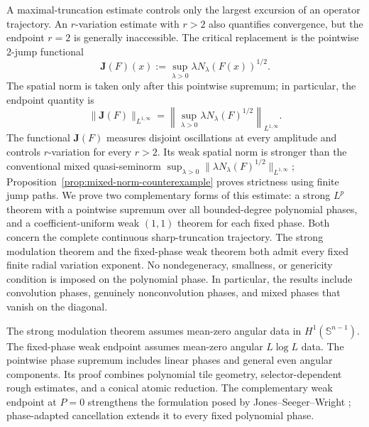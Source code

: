 \documentclass[11pt]{article}
\numberwithin{equation}{section}
\theoremstyle{remark}
\theoremstyle{definition}
\newcommand{\norm}[1]{\lVert #1\rVert}
\begin{document}
A maximal-truncation estimate controls only the largest excursion of an
operator trajectory.  An $r$-variation estimate with $r>2$ also quantifies
convergence, but the endpoint $r=2$ is generally inaccessible.  The
critical replacement is the pointwise $2$-jump functional
\begin{equation}\label{eq:intro-pointwise-jump}
 \mathbf J(F)(x)
 :=\sup_{\lambda>0}\lambda N_\lambda(F(x))^{1/2}.
\end{equation}
The spatial norm is taken only after this pointwise supremum; in particular,
the endpoint quantity is
\[
 \norm{\mathbf J(F)}_{L^{1,\infty}}
 =\left\|\sup_{\lambda>0}
 \lambda N_\lambda(F)^{1/2}\right\|_{L^{1,\infty}}.
\]
The functional $\mathbf J(F)$ measures disjoint oscillations at every
amplitude and controls $r$-variation for every $r>2$. Its weak spatial
norm is stronger than the conventional mixed quasi-seminorm
$\sup_{\lambda>0}\|\lambda N_\lambda(F)^{1/2}\|_{L^{1,\infty}}$;
Proposition~\ref{prop:mixed-norm-counterexample} proves strictness using
finite jump paths.  We prove two complementary forms of this estimate: a strong
$L^p$ theorem with a pointwise supremum over all bounded-degree polynomial
phases, and a coefficient-uniform weak $(1,1)$ theorem for each fixed
phase. Both concern the complete continuous sharp-truncation trajectory.
The strong modulation theorem and the fixed-phase weak theorem both
admit every fixed finite radial variation exponent.
No nondegeneracy, smallness, or genericity condition is imposed on the
polynomial phase. In particular, the results include convolution phases,
genuinely nonconvolution phases, and mixed phases that vanish on the
diagonal.

The strong modulation theorem assumes mean-zero angular data in
$H^1(\mathbb S^{n-1})$. The fixed-phase weak endpoint assumes
mean-zero angular $L\log L$ data. The pointwise phase supremum includes linear phases and general even
angular components. Its proof combines polynomial tile geometry,
selector-dependent rough estimates, and a conical atomic reduction.
The complementary weak endpoint at $P=0$ strengthens the formulation
posed by Jones--Seeger--Wright \cite{JSW}; phase-adapted cancellation
extends it to every fixed polynomial phase.
\end{document}
